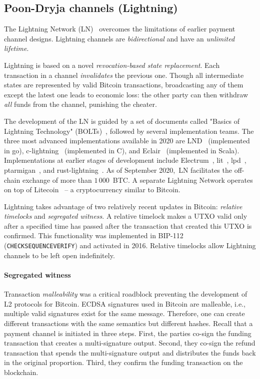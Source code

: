\subsection{Poon-Dryja channels (Lightning)}

The Lightning Network (LN)~\cite{Poon2016} overcomes the limitations of earlier payment channel designs.
Lightning channels are \textit{bidirectional} and have an \textit{unlimited lifetime}.

Lightning is based on a novel \textit{revocation-based state replacement}.
Each transaction in a channel \textit{invalidates} the previous one.
Though all intermediate states are represented by valid Bitcoin transactions, broadcasting any of them except the latest one leads to economic loss: the other party can then withdraw \textit{all} funds from the channel, punishing the cheater.

The development of the LN is guided by a set of documents called "Basics of Lightning Technology" (BOLTs)~\cite{BOLT}, followed by several implementation teams.
The three most advanced implementations available in 2020 are LND~\cite{LND} (implemented in go), c-lightning~\cite{clightning} (implemented in C), and Eclair~\cite{Eclair} (implemented in Scala).
Implementations at earlier stages of development include Electrum~\cite{ElectrumWebsite, ElectrumLightningAnnounce}, lit~\cite{lit}, lpd~\cite{lpd}, ptarmigan~\cite{ptarmigan}, and rust-lightning~\cite{rustlightning}.
As of September 2020,~LN facilitates the off-chain exchange of more than $1\,000$~BTC\@.
A separate Lightning Network operates on top of Litecoin~\cite{1MLLitecoin} -- a cryptocurrency similar to Bitcoin.

Lightning takes advantage of two relatively recent updates in Bitcoin: \textit{relative timelocks} and \textit{segregated witness}.
A relative timelock makes a UTXO valid only after a specified time has passed after the transaction that created this UTXO is confirmed.
This functionality was implemented in BIP-112~\cite{BtcDrak2015} (\texttt{CHECKSEQUENCEVERIFY}) and activated in 2016.
Relative timelocks allow Lightning channels to be left open indefinitely.


\paragraph{Segregated witness}

Transaction \textit{malleability} was a critical roadblock preventing the development of L2 protocols for Bitcoin.
ECDSA signatures used in Bitcoin are malleable, i.e., multiple valid signatures exist for the same message.
Therefore, one can create different transactions with the same semantics but different hashes.
Recall that a payment channel is initiated in three steps.
First, the parties co-sign the funding transaction that creates a multi-signature output.
Second, they co-sign the refund transaction that spends the multi-signature output and distributes the funds back in the original proportion.
Third, they confirm the funding transaction on the blockchain.

